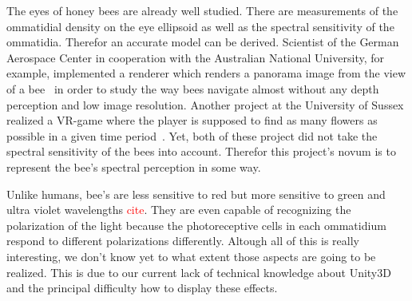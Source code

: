 \documentclass{acm_proc_article-sp}
\newcommand{\todo}[1]{\textcolor{Red}{#1}}
\begin{document}
The eyes of honey bees are already well studied. There are measurements
of the ommatidial density on the eye ellipsoid as well as the spectral
sensitivity of the ommatidia. Therefor an accurate model can be derived.
Scientist of the German Aerospace Center in cooperation with the Australian
National University, for example, implemented a renderer
which renders a panorama image from the view of a bee \cite{insectvision}
in order to study the way bees navigate almost without any depth perception and
low image resolution.
Another project at the University of Sussex realized a VR-game where the
player is supposed to find as many flowers as possible in a given time
period \cite{beepilot}.
Yet, both of these project did not take the spectral sensitivity of the bees
into account. Therefor this project's novum is to represent the bee's spectral
perception in some way.

Unlike humans, bee's are less sensitive to red but more sensitive to green and
ultra violet wavelengths \todo{cite}. They are even capable of recognizing the
polarization of the light because the photoreceptive cells in each ommatidium
respond to different polarizations differently.
Altough all of this is really interesting, we don't know yet to what extent those
aspects are going to be realized. This is due to our current lack of technical
knowledge about Unity3D and the principal difficulty how to display these
effects.
\end{document}
